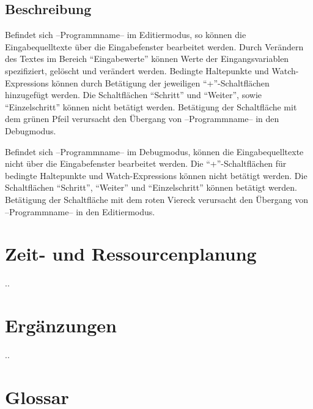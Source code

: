 \documentclass[parskip=full]{scrartcl}
\begin{document}
    \subsection{Beschreibung}
        Befindet sich --Programmname-- im Editiermodus, so können die Eingabequelltexte über die 
        Eingabefenster bearbeitet werden.
        Durch Verändern des Textes im Bereich \enquote{Eingabewerte} können Werte der Eingangsvariablen
        spezifiziert, gelöscht und verändert werden. 
        Bedingte Haltepunkte und Watch-Expressions können durch Betätigung der jeweiligen 
        \enquote{+}-Schaltflächen hinzugefügt werden.
        Die Schaltflächen \enquote{Schritt} und \enquote{Weiter}, sowie \enquote{Einzelschritt} können nicht betätigt
        werden. Betätigung der Schaltfläche mit dem grünen Pfeil verursacht den Übergang von
        --Programmname-- in den Debugmodus.
        
        Befindet sich --Programmname-- im Debugmodus, können die Eingabequelltexte nicht
        über die Eingabefenster bearbeitet werden. Die \enquote{+}-Schaltflächen für bedingte Haltepunkte
        und Watch-Expressions können nicht betätigt werden.
        Die Schaltflächen \enquote{Schritt}, \enquote{Weiter} und \enquote{Einzelschritt} können betätigt werden.
        Betätigung der Schaltfläche mit dem roten Viereck verursacht den Übergang von --Programmname-- in den Editiermodus.
        
        
\section{Zeit- und Ressourcenplanung}
..

\section{Ergänzungen}
..

\section{Glossar}
\end{document}
